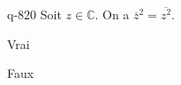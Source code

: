 \begin{truefalse}{q-820}
Soit $z\in \mathbb C$. On a $\overline{z}^2=\overline{z^2}$.
\item* Vrai
\item Faux
\end{truefalse}

